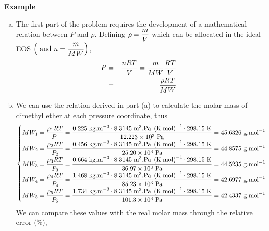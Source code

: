 \begin{MyExample}{\begin{center}{\bf Example}\end{center}}
       \begin{enumerate}[a)]
           \item The first part of the problem requires the development of a mathematical relation between $P$ and $\rho$. Defining $\rho=\displaystyle\frac{m}{V}$ which can be allocated in the ideal EOS $\left(\text{ and }n=\displaystyle\frac{m}{MW}\right)$,
              \begin{eqnarray}
                 P &=& \displaystyle\frac{n R T }{V} = \displaystyle\frac{m}{MW}\displaystyle\frac{R T}{V} \nonumber\\ 
                   &=& \displaystyle\frac{\rho R T}{MW}\nonumber
              \end{eqnarray}
%
           \item We can use the relation derived in part (a) to calculate the molar mass of dimethyl ether at each pressure coordinate, thus
              \begin{displaymath}
                  \begin{cases}
                     MW_{1} = \displaystyle\frac{\rho_{1} R T}{P_{1}} = \displaystyle\frac{0.225\text{ kg.m}^{-3}\cdot 8.3145\text{ m}^{3}\text{.Pa.}\left(\text{K.mol}\right)^{-1}\cdot 298.15\text{ K}}{12.223\times 10^{3}\text{ Pa}} = 45.6326 \text{ g.mol}^{-1} \\
                     MW_{2} = \displaystyle\frac{\rho_{2} R T}{P_{2}} = \displaystyle\frac{0.456\text{ kg.m}^{-3}\cdot 8.3145\text{ m}^{3}\text{.Pa.}\left(\text{K.mol}\right)^{-1}\cdot 298.15\text{ K}}{25.20\times 10^{3}\text{ Pa}} = 44.8575 \text{ g.mol}^{-1} \\
                     MW_{3} = \displaystyle\frac{\rho_{3} R T}{P_{3}} = \displaystyle\frac{0.664\text{ kg.m}^{-3}\cdot 8.3145\text{ m}^{3}\text{.Pa.}\left(\text{K.mol}\right)^{-1}\cdot 298.15\text{ K}}{36.97\times 10^{3}\text{ Pa}} = 44.5235 \text{ g.mol}^{-1} \\
                     MW_{4} = \displaystyle\frac{\rho_{4} R T}{P_{4}} = \displaystyle\frac{1.468\text{ kg.m}^{-3}\cdot 8.3145\text{ m}^{3}\text{.Pa.}\left(\text{K.mol}\right)^{-1}\cdot 298.15\text{ K}}{85.23\times 10^{3}\text{ Pa}} = 42.6977 \text{ g.mol}^{-1} \\
                     MW_{5} = \displaystyle\frac{\rho_{5} R T}{P_{5}} = \displaystyle\frac{1.734\text{ kg.m}^{-3}\cdot 8.3145\text{ m}^{3}\text{.Pa.}\left(\text{K.mol}\right)^{-1}\cdot 298.15\text{ K}}{101.3\times 10^{3}\text{ Pa}} = 42.4337 \text{ g.mol}^{-1} \\
                  \end{cases} 
              \end{displaymath}
              We can compare these values with the real molar mass through the relative error ($\%$),

\end{enumerate}
\end{MyExample}

